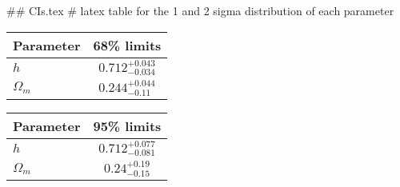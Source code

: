 ## CIs.tex
# latex table for the 1 and 2 sigma distribution of each parameter

\begin{tabular} { l  c}
 Parameter &  68\% limits\\
\hline
{\boldmath$h              $} & $0.712^{+0.043}_{-0.034}   $\\
{\boldmath$\Omega_m       $} & $0.244^{+0.044}_{-0.11}    $\\
\hline
\end{tabular}

\begin{tabular} { l  c}
 Parameter &  95\% limits\\
\hline
{\boldmath$h              $} & $0.712^{+0.077}_{-0.081}   $\\
{\boldmath$\Omega_m       $} & $0.24^{+0.19}_{-0.15}      $\\
\hline
\end{tabular}
